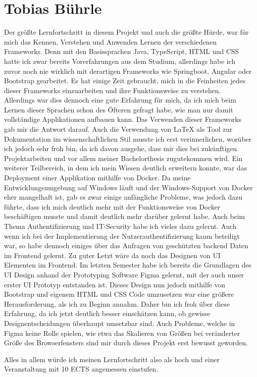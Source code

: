 \section{Tobias Bührle}
Der größte Lernfortschritt in diesem Projekt und auch die größte Hürde, war für mich das
Kennen, Verstehen und Anwenden Lernen der verschiedenen Frameworks. Denn mit den
Basissprachen Java, TypeScript, HTML und CSS hatte ich zwar bereits Vorerfahrungen aus dem
Studium, allerdings habe ich zuvor noch nie wirklich mit derartigen Frameworks wie
Springboot, Angular oder Bootstrap gearbeitet. Es hat einige Zeit gebraucht, mich in die
Feinheiten jedes dieser Frameworks einzuarbeiten und ihre Funktionsweise zu verstehen.
Allerdings war dies dennoch eine gute Erfahrung für mich, da ich mich beim
Lernen dieser Sprachen schon des Öfteren gefragt habe, wie man nur damit vollständige
Applikationen aufbauen kann. Das Verwenden dieser Frameworks gab mir die Antwort darauf.
Auch die Verwendung von LaTeX als Tool zur Dokumentation im wissenschaftlichen Stil
musste ich erst verinnerlichen, worüber ich jedoch sehr froh bin, da ich davon ausgehe,
dass mir dies bei zukünftigen Projektarbeiten und vor allem meiner Bachelorthesis 
zugutekommen wird. Ein weiterer Teilbereich, in dem ich mein Wissen deutlich erweitern 
konnte, war das Deployment einer Applikation mithilfe von Docker. Da meine 
Entwicklungsumgebung
auf Windows läuft und der Windows-Support von Docker eher mangelhaft ist, gab es zwar
einige anfängliche Probleme, was jedoch dazu führte, dass ich mich deutlich mehr
mit der Funktionsweise von Docker beschäftigen musste und damit deutlich mehr darüber
gelernt habe. Auch beim Thema Authentifizierung und IT-Security habe ich vieles dazu
gelernt. Auch wenn ich bei der Implementierung der Nutzerauthentifizierung kaum beteiligt
war, so habe dennoch einiges über das Anfragen von geschützten backend Daten im
Frontend gelernt. Zu guter Letzt wäre da noch das Designen von \ac{UI} Elementen im
Frontend. Im letzten Semester habe ich bereits die Grundlagen des UI Design anhand der
Prototyping Software Figma gelernt, mit der auch unser erster \ac{UI} Prototyp entstanden
ist. Dieses Design nun jedoch mithilfe von Bootstrap und eigenem HTML und CSS Code
umzusetzen war eine größere Herausforderung, als ich zu Beginn annahm. Daher bin ich froh
über diese Erfahrung, da ich jetzt deutlich besser einschätzen kann, ob gewisse
Designentscheidungen überhaupt umsetzbar sind. Auch Probleme, welche in Figma keine Rolle
spielen, wie etwa das Skalieren von Größen bei veränderter Größe des Browserfensters sind
mir durch dieses Projekt erst bewusst geworden.

Alles in allem würde ich meinen Lernfortschritt also als hoch und einer Veranstaltung mit
10 \ac{ECTS} angemessen einstufen.